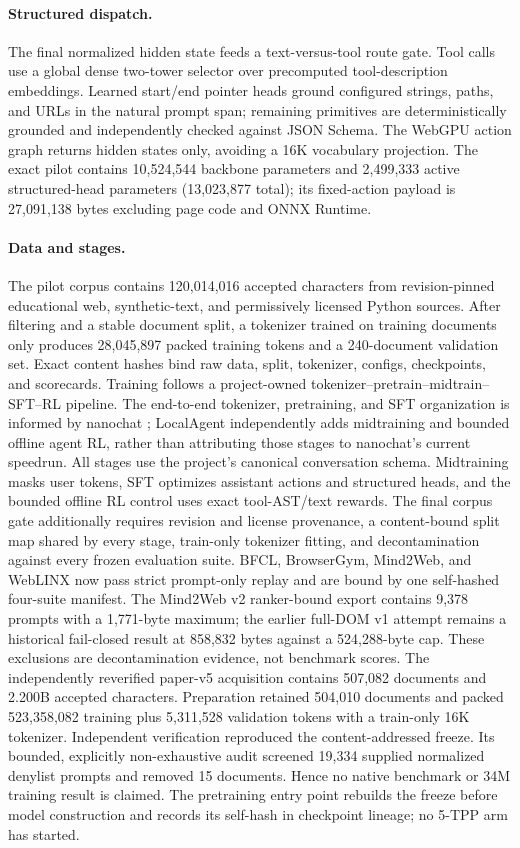 \documentclass{article}
\begin{document}
\paragraph{Structured dispatch.}
The final normalized hidden state feeds a text-versus-tool route gate.  Tool calls use a global
dense two-tower selector over precomputed tool-description embeddings.  Learned start/end pointer
heads ground configured strings, paths, and URLs in the natural prompt span; remaining primitives
are deterministically grounded and independently checked against JSON Schema.  The WebGPU action
graph returns hidden states only, avoiding a 16K vocabulary projection.  The exact pilot contains
10,524,544 backbone parameters and 2,499,333 active structured-head parameters (13,023,877 total);
its fixed-action payload is 27,091,138 bytes excluding page code and ONNX Runtime.

\paragraph{Data and stages.}
The pilot corpus contains 120,014,016 accepted characters from revision-pinned educational web,
synthetic-text, and permissively licensed Python sources.  After filtering and a stable document
split, a tokenizer trained on training documents only produces 28,045,897 packed training tokens
and a 240-document validation set.  Exact content hashes bind raw data, split, tokenizer, configs,
checkpoints, and scorecards.  Training follows a project-owned
tokenizer--pretrain--midtrain--SFT--RL pipeline.  The end-to-end tokenizer, pretraining, and SFT
organization is informed by nanochat \citep{karpathy2025nanochat}; LocalAgent independently adds
midtraining and bounded offline agent RL, rather than attributing those stages to nanochat's
current speedrun.  All stages use the project's canonical conversation schema.  Midtraining masks
user tokens, SFT
optimizes assistant actions and structured heads, and the bounded offline RL control uses exact
tool-AST/text rewards.  The final corpus gate additionally requires revision and license
provenance, a content-bound split map shared by every stage, train-only tokenizer fitting, and
decontamination against every frozen evaluation suite.  BFCL, BrowserGym, Mind2Web, and WebLINX
now pass strict prompt-only replay and are bound by one self-hashed four-suite manifest.  The
Mind2Web v2 ranker-bound export contains 9,378 prompts with a 1,771-byte maximum; the earlier
full-DOM v1 attempt remains a historical fail-closed result at 858,832 bytes against a
524,288-byte cap.  These exclusions are decontamination evidence, not benchmark scores.  The
independently reverified paper-v5 acquisition contains 507,082 documents and 2.200B accepted
characters.  Preparation retained 504,010 documents and packed 523,358,082 training plus
5,311,528 validation tokens with a train-only 16K tokenizer.  Independent verification reproduced
the content-addressed freeze.  Its bounded, explicitly non-exhaustive audit screened 19,334
supplied normalized denylist prompts and removed 15 documents.  Hence no native benchmark or 34M
training result is claimed.  The pretraining entry point rebuilds the freeze before model
construction and records its self-hash in checkpoint lineage; no 5-TPP arm has started.
\end{document}
